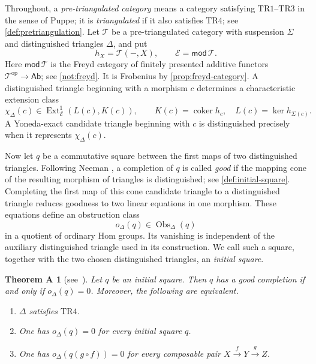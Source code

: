 \documentclass[a4paper,11pt,reqno]{amsart}
\theoremstyle{definition}
\theoremstyle{plain}
\newtheorem*{maintheorema}{Theorem A}
\numberwithin{equation}{section}
\newcommand{\T}{\mathcal T}
\newcommand{\coker}{\operatorname{coker}}
\newcommand{\Ext}{\operatorname{Ext}}
\begin{document}
Throughout, a \emph{pre-triangulated category} means a category satisfying
$\mathrm{TR1}$--$\mathrm{TR3}$ in the sense of Puppe; it is
\emph{triangulated} if it also satisfies $\mathrm{TR4}$; see
\cref{def:pretriangulation}.  Let $\T$ be a
pre-triangulated category with suspension $\Sigma$ and distinguished
triangles $\Delta$, and put
\[
 h_X=\T(-,X),\qquad
 \mathcal E=\mathsf{mod}\,\T.
\]
Here $\mathsf{mod}\,\T$ is the Freyd category of finitely presented
additive functors $\T^{\mathrm{op}}\to\mathsf{Ab}$; see
\cref{not:freyd}.  It is Frobenius by \cref{prop:freyd-category}.
A distinguished triangle
beginning with a morphism $c$ determines a characteristic extension class
\[
 \chi_\Delta(c)\in
 \Ext^1_{\mathcal E}(L(c),K(c)),
 \qquad K(c)=\coker h_c,\quad L(c)=\ker h_{\Sigma(c)}.
\]
A Yoneda-exact candidate triangle beginning with $c$ is distinguished
precisely when it represents $\chi_\Delta(c)$.

Now let $q$ be a commutative square between the first maps of two
distinguished triangles.  Following Neeman
\cite[Definition~1.3.14]{Neeman2001}, a completion of $q$ is called
\emph{good} if the mapping cone of the resulting morphism of triangles is
distinguished; see \cref{def:initial-square}.  Completing the first map of this cone
candidate triangle to a distinguished triangle reduces goodness to two
linear equations in one morphism.  These equations define an obstruction
class
\[
 o_\Delta(q)\in\operatorname{Obs}_\Delta(q)
\]
in a quotient of ordinary Hom groups.  Its vanishing is independent of the
auxiliary distinguished triangle used in its construction.
We call such a square, together with the two chosen distinguished triangles, an
\emph{initial square}.

\begin{maintheorema}[{\normalfont see~}]
Let $q$ be an initial square.  Then $q$ has a good completion if and only if
$o_\Delta(q)=0$.  Moreover, the following are equivalent.
\begin{enumerate}[label=\textup{(\roman*)}]
\item $\Delta$ satisfies $\mathrm{TR4}$.
\item One has $o_\Delta(q)=0$ for every initial square $q$.
\item One has $o_\Delta(q(g\circ f))=0$ for every composable pair
      $X\xrightarrow{f}Y\xrightarrow{g}Z$.
\end{enumerate}
\end{maintheorema}
\end{document}
